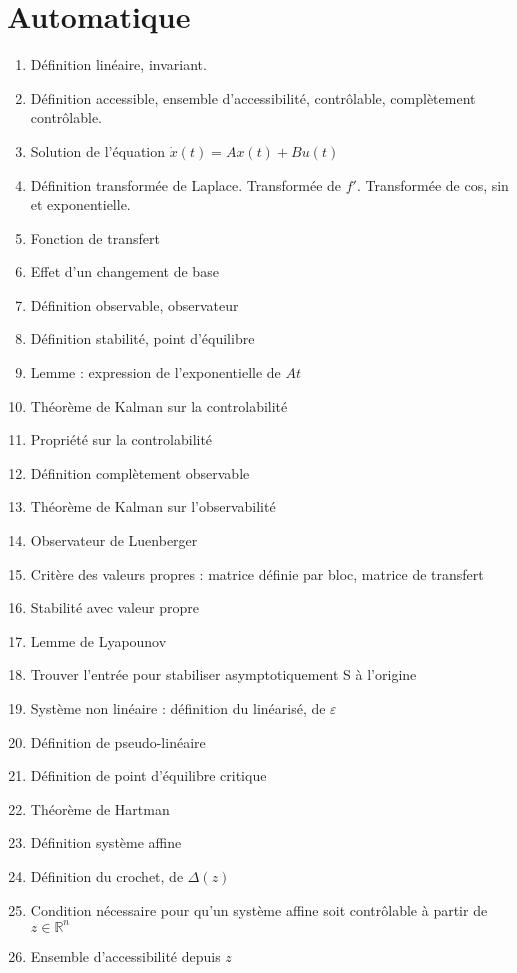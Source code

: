 \documentclass{article}
\begin{document}
\setcounter{tocdepth}{4}
\tableofcontents
\newpage

\part{Automatique}
\begin{enumerate}
\item Définition linéaire, invariant.
\item Définition accessible, ensemble d'accessibilité, contrôlable, complètement contrôlable.
\item Solution de l'équation $\dot{x}(t)=Ax(t)+Bu(t)$
\item Définition transformée de Laplace. Transformée de $f'$. Transformée de cos, sin et exponentielle.
\item Fonction de transfert
\item Effet d'un changement de base
\item Définition observable, observateur
\item Définition stabilité, point d'équilibre
\item Lemme : expression de l'exponentielle de $At$
\item Théorème de Kalman sur la controlabilité
\item Propriété sur la controlabilité
\item Définition complètement observable
\item Théorème de Kalman sur l'observabilité
\item Observateur de Luenberger
\item Critère des valeurs propres : matrice définie par bloc, matrice de transfert
\item Stabilité avec valeur propre
\item Lemme de Lyapounov
\item Trouver l'entrée pour stabiliser asymptotiquement S à l'origine
\item Système non linéaire : définition du linéarisé, de $\varepsilon$
\item Définition de pseudo-linéaire
\item Définition de point d'équilibre critique
\item Théorème de Hartman
\item Définition système affine
\item Définition du crochet, de $\Delta(z)$
\item Condition nécessaire pour qu'un système affine soit contrôlable à partir de $z\in\mathbb{R}^n$
\item Ensemble d'accessibilité depuis $z$

\end{enumerate}
\end{document}
